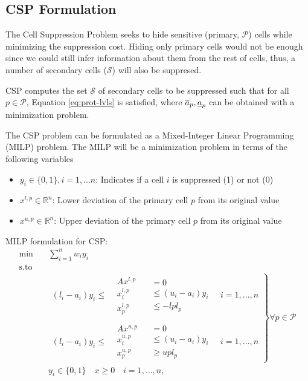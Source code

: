 \documentclass[11pt,a4paper]{article}
\begin{document}
 
\subsection{CSP Formulation}

The Cell Suppression Problem seeks to hide sensitive (primary, $\mathcal{P}$) cells while minimizing
the suppression cost. Hiding only primary cells would not be enough since we could still infer
information about them from the rest of cells, thus, a number of secondary cells ($\mathcal{S}$) will
also be suppresed.

CSP computes the set $\mathcal{S}$ of secondary cells to be suppressed such that for all $p\in\mathcal{P}$, 
Equation \ref{eq:prot-lvls} is satisfied, where $\overline{a}_p,  \underbar{$a$}_p$ can be obtained with a minimization problem.

The CSP problem can be formulated as a Mixed-Integer Linear Programming (MILP) problem.
The MILP will be a minimization problem in terms of the following variables
\begin{itemize}
  \item $y_i\in\{0,1\}, i=1, ...n$: Indicates if a cell $i$ is suppressed (1) or not (0)
  \item $x^{l,p}\in \mathbb{R}^n$: Lower deviation of the primary cell $p$ from its original value
  \item $x^{u,p}\in \mathbb{R}^n$: Upper deviation of the primary cell $p$ from its original value
\end{itemize}

MILP formulation for CSP:
\begin{align*}
\min \quad & \sum_{i=1}^{n} w_i y_i \\
\text{s.to} \quad & \\
& \left. \begin{array}{rll}
(l_i - a_i)y_i \leq & \begin{array}{l} Ax^{l,p} \\ x_i^{l,p} \\ x_p^{l,p} \end{array} & \begin{array}{l} = 0 \\ \leq (u_i - a_i)y_i \\ \leq -lpl_p \end{array} \quad i = 1, \dots, n \\ \\
(l_i - a_i)y_i \leq & \begin{array}{l} Ax^{u,p} \\ x_i^{u,p} \\ x_p^{u,p} \end{array} & \begin{array}{l} = 0 \\ \leq (u_i - a_i)y_i \\ \geq upl_p \end{array} \quad i = 1, \dots, n
\end{array} \right\} \forall p \in \mathcal{P} \\
& y_i \in \{0, 1\} \quad x\ge 0\quad i = 1, \dots, n,
\end{align*}
\end{document}
